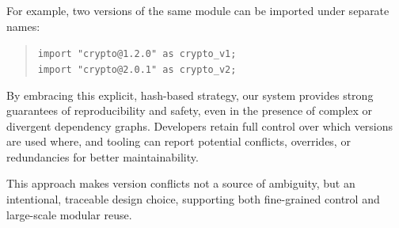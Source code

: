 \documentclass[sigplan,screen]{acmart}
\begin{document}
For example, two versions of the same module can be imported under separate names:
\begin{quote}
\texttt{import "crypto@1.2.0" as crypto\_v1;}\\
\texttt{import "crypto@2.0.1" as crypto\_v2;}
\end{quote}

By embracing this explicit, hash-based strategy, our system provides strong guarantees of reproducibility and safety, even in the presence of complex or divergent dependency graphs. Developers retain full control over which versions are used where, and tooling can report potential conflicts, overrides, or redundancies for better maintainability.

This approach makes version conflicts not a source of ambiguity, but an intentional, traceable design choice, supporting both fine-grained control and large-scale modular reuse.

\end{document}
